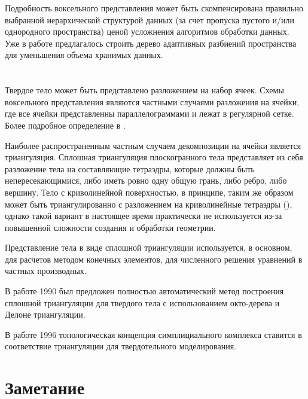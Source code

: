 Подробность воксельного представления может быть скомпенсирована правильно выбранной иерархической структурой данных (за счет пропуска пустого и/или однородного пространства) ценой усложнения алгоритмов обработки данных. Уже в работе \cite{REDD78} предлагалось строить дерево адаптивных разбиений пространства для уменьшения объема хранимых данных.


\section{} \label{sect_cell_decompositions}

Твердое тело может быть представлено разложением на набор ячеек. Схемы воксельного представления являются частными случаями разложения на ячейки, где все ячейки представленны параллелограммами и лежат в регулярной сетке. Более подробное определение в \cite{Requicha80}.

Наиболее распространенным частным случаем декомпозиции на ячейки является триангуляция. Сплошная триангуляция плоскогранного тела представляет из себя разложение тела на составляющие тетраэдры, которые должны быть непересекающимися, либо иметь ровно одну общую грань, либо ребро, либо вершину. Тело с криволинейной поверхностью, в принципе, таким же образом может быть триангулированно с разложением на криволинейные тетраэдры (), однако такой вариант в настоящее время практически не используется из-за повышенной сложности создания и обработки геометрии.

Представление тела в виде сплошной триангуляции используется, в основном, для расчетов методом конечных элементов, для численного решения уравнений в частных производных.

В работе \cite{A combined octree/Delaunay method for fully automatic 3-d mesh generation} 1990 был предложен полностью автоматический метод построения сплошной триангуляции для твердого тела с использованием окто-дерева и Делоне триангуляции.

В работе \cite{Modeling with Simplicial Complexes} 1996 топологическая концепция симплициального комплекса ставится в соответствие триангуляции для твердотельного моделирования. 



\section{Заметание} \label{sect_sweeping}

